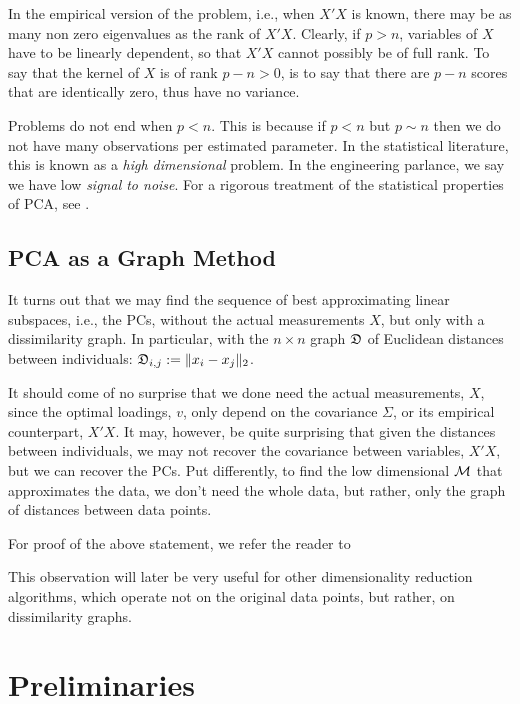 \documentclass[12pt,a4paper]{article}
\begin{document}
In the empirical version of the problem, i.e., when $X'X$ is known, there may be as many non zero eigenvalues as the rank of $X'X$.
Clearly, if $p>n$, variables of $X$ have to be linearly dependent, so that $X'X$ cannot possibly be of full rank.
To say that the kernel of $X$ is of rank $p-n>0$, is to say that there are $p-n$ scores that are identically zero, thus have no variance. 


Problems do not end when $p<n$. 
This is because if $p<n$ but $p\sim n$ then we do not have many observations per estimated parameter. 
In the statistical literature, this is known as a \emph{high dimensional} problem. 
In the engineering parlance, we say we have low \emph{signal to noise}.
For a rigorous treatment of the statistical properties of PCA, see \cite{nadler2008finite}.
 





\subsection{PCA as a Graph Method}
\label{remark:pca_as_graph}

It turns out that we may find the sequence of best approximating linear subspaces, i.e., the PCs, without the actual measurements $X$, but only with a dissimilarity graph. 
In particular, with the $n\times n$ graph $\mathfrak{D}$ of Euclidean distances between individuals: $\mathfrak{D}_{i,j}:= \Vert x_i-x_j \Vert_2$. 

It should come of no surprise that we done need the actual measurements, $X$, since the optimal loadings, $v$, only depend on the covariance $\Sigma$, or its empirical counterpart, $X'X$. 
It may, however, be quite surprising that given the distances between individuals, we may not recover the covariance between variables, $X'X$, but we can recover the PCs. 
Put differently, to find the low dimensional $\mathcal{M}$ that approximates the data, we don't need the whole data, but rather, only the graph of distances between data points. 

For proof of the above statement, we refer the reader to \cite[Sec.18.5.2]{friedman2001elements}

This observation will later be very useful for other dimensionality reduction algorithms, which operate not on the original data points, but rather, on dissimilarity graphs. 





\section{Preliminaries}
\end{document}
